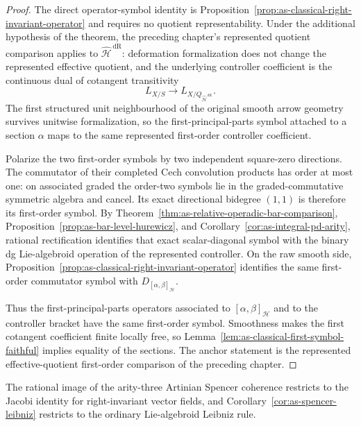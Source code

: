 \begin{proof}
The direct operator-symbol identity is
Proposition~\ref{prop:as-classical-right-invariant-operator} and requires no
quotient representability.  Under the additional hypothesis of the theorem,
the preceding chapter's represented quotient comparison applies to
$\widehat{\mathcal H}^{\,\mathrm{dR}}$: deformation formalization does not
change the represented effective quotient, and the underlying controller
coefficient is the continuous dual of cotangent transitivity
\[
    L_{X/S}
    \longrightarrow
    L_{X/Q_{\widehat{\mathcal H}^{\,\mathrm{dR}}}}.
\]
The first structured unit neighbourhood of the original smooth arrow geometry
survives unitwise formalization, so the first-principal-parts symbol attached
to a section $\alpha$ maps to the same represented first-order controller
coefficient.

Polarize the two first-order symbols by two independent square-zero
directions.  The commutator of their completed Cech convolution products has
order at most one: on associated graded the order-two symbols lie in the
graded-commutative symmetric algebra and cancel.  Its exact directional
bidegree $(1,1)$ is therefore its first-order symbol.  By
Theorem~\ref{thm:as-relative-operadic-bar-comparison},
Proposition~\ref{prop:as-bar-level-hurewicz}, and
Corollary~\ref{cor:as-integral-pd-arity}, rational rectification identifies
that exact scalar-diagonal symbol with the binary dg Lie-algebroid operation
of the represented controller.  On the raw smooth side,
Proposition~\ref{prop:as-classical-right-invariant-operator} identifies the
same first-order commutator symbol with
$D_{[\alpha,\beta]_{\mathcal H}}$.

Thus the first-principal-parts operators associated to
$[\alpha,\beta]_{\mathcal H}$ and to the controller bracket have the same
first-order symbol.  Smoothness makes the first cotangent coefficient finite
locally free, so
Lemma~\ref{lem:as-classical-first-symbol-faithful} implies equality of the
sections.  The anchor statement is the represented effective-quotient
first-order comparison of the preceding chapter.
\end{proof}

\begin{corollary}
\label{cor:as-classical-jacobi-leibniz}
The rational image of the arity-three Artinian Spencer coherence restricts
to the Jacobi identity for right-invariant vector fields, and
Corollary~\ref{cor:as-spencer-leibniz}
restricts to the ordinary Lie-algebroid Leibniz rule.
\end{corollary}

